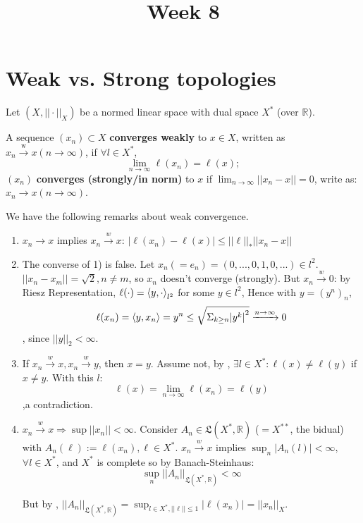 \documentclass{article}
\title{Week 8}
\begin{document}
  
\maketitle
\section{Weak vs. Strong topologies}
Let $(X, || \cdot ||_X)$ be a normed linear space with dual space $X^*$ (over $\mathbb{R}$).

\begin{definition}\nl
A sequence $(x_n) \subset X$ \textbf{converges weakly} to $x\in X$, written as $x_n \xrightarrow{\text{w}} x (n \rightarrow \infty)$, if $\forall l \in X^*$, 
    $$\lim_{n\rightarrow \infty} \ell(x_n) = \ell(x);$$
$(x_n)$ \textbf{converges (strongly/in norm)} to $x$ if $\lim_{n\rightarrow \infty} ||x_n - x|| = 0$, write as: $x_n \rightarrow x (n\rightarrow \infty).$
\end{definition}

\begin{remark}
\label{properties of weak convergence}
We have the following remarks about weak convergence.  

\begin{enumerate}[1)]
    \item $x_n\rightarrow x$ implies  $x_n \xrightarrow{w} x$: $|\ell(x_n) - \ell(x)| \leq ||\ell||_* ||x_n - x||$
    
    \item The converse of 1) is false. Let $x_n (= e_n) = (0,...,0,1,0,...) \in l^2$. $||x_n-x_m|| = \sqrt{2}, n\neq m$, so $x_n$ doesn't converge (strongly). But $x_n \xrightarrow{w} 0$: by Riesz Representation, $\ell(\cdot) = \left<{y},{\cdot}\right>_{l^2}$ for some $y \in l^2$, Hence with $y=(y^n)_n$, $$\ell(x_n) = \left<{y},{x_n}\right> = y^n \leq \sqrt{\Sigma_{k\geq n} {|y^k|}^2} \xrightarrow{n\rightarrow \infty} 0$$, since $||y||_2 < \infty$.
    
    \item If $x_n \xrightarrow{w} x, x_n \xrightarrow{w} y$, then $x=y$. Assume not, by , $\exists l \in X^*: \ell(x) \neq \ell(y)$ if $x\neq y$. With this $l$: $$\ell(x) = \lim_{n \to \infty} \ell(x_n) = \ell(y) $$ 
    ,a contradiction.
    
    \item $x_n \xrightarrow{w} x \Rightarrow \sup||x_n|| < \infty$. Consider $A_n \in \mathfrak{L}(X^*, \mathbb{R})$ ($=X^{**}$, the bidual) with $A_n(\ell) := \ell(x_n), \ell \in X^*$. $x_n \xrightarrow{w} x$ implies $\sup_n |A_n(l)| < \infty,$ $\forall l\in X^*$, and $X^*$ is complete so by Banach-Steinhaus: $$\sup_n ||A_n||_{\mathfrak{L}(X^*, \mathbb{R})} < \infty$$ 
    
    But by ,  $||A_n||_{\mathfrak{L}(X^*,\mathbb{R})} = \sup_{l\in X^*, ||\ell||\leq 1} |\ell(x_n)| = ||x_n||_X$.
\end{enumerate}
\end{remark}
\end{document}
